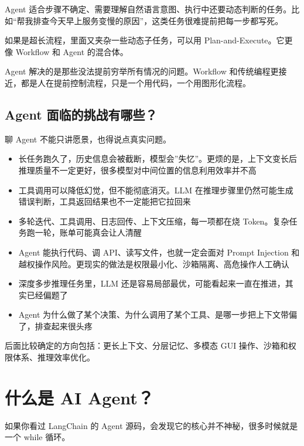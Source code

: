 \documentclass[10pt,a4paper]{ctexart}
\begin{document}
Agent 适合步骤不确定、需要理解自然语言意图、执行中还要动态判断的任务。比如“帮我排查今天早上服务变慢的原因”，这类任务很难提前把每一步都写死。



如果是超长流程，里面又夹杂一些动态子任务，可以用 Plan-and-Execute。它更像 Workflow 和 Agent 的混合体。



Agent 解决的是那些没法提前穷举所有情况的问题。Workflow 和传统编程更接近，都是人在提前控制流程，只是一个用代码，一个用图形化流程。



\subsection{Agent 面临的挑战有哪些？}


聊 Agent 不能只讲愿景，也得说点真实问题。


\begin{itemize}[itemsep=2pt, topsep=4pt]
  \item 长任务跑久了，历史信息会被截断，模型会”失忆”。更烦的是，上下文变长后推理质量不一定更好，很多模型对中间位置的信息利用效率并不高
  \item 工具调用可以降低幻觉，但不能彻底消灭。LLM 在推理步骤里仍然可能生成错误判断，工具返回结果也不一定能把它拉回来
  \item 多轮迭代、工具调用、日志回传、上下文压缩，每一项都在烧 Token。复杂任务跑一轮，账单可能真会让人清醒
  \item Agent 能执行代码、调 API、读写文件，也就一定会面对 Prompt Injection 和越权操作风险。更现实的做法是权限最小化、沙箱隔离、高危操作人工确认
  \item 深度多步推理任务里，LLM 还是容易局部最优，可能看起来一直在推进，其实已经偏题了
  \item Agent 为什么做了某个决策、为什么调用了某个工具、是哪一步把上下文带偏了，排查起来很头疼
\end{itemize}


后面比较确定的方向包括：更长上下文、分层记忆、多模态 GUI 操作、沙箱和权限体系、推理效率优化。



\section{什么是 AI Agent？}


如果你看过 LangChain 的 Agent 源码，会发现它的核心并不神秘，很多时候就是一个 while 循环。
\end{document}

